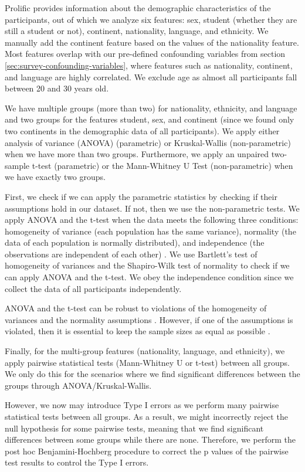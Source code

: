 %
Prolific provides information about the demographic characteristics of the participants, out of which we analyze six features: sex, student (whether they are still a student or not), continent, nationality, language, and ethnicity.
%
We manually add the continent feature based on the values of the nationality feature.
%
Most features overlap with our pre-defined confounding variables from section \ref{sec:survey-confounding-variables}, where features such as nationality, continent, and language are highly correlated.
%
We exclude age as almost all participants fall between 20 and 30 years old.
%

%
We have multiple groups (more than two) for nationality, ethnicity, and language and two groups for the features student, sex, and continent (since we found only two continents in the demographic data of all participants).
%
We apply either analysis of variance (ANOVA) (parametric) or Kruskal-Wallis (non-parametric) when we have more than two groups.
%
Furthermore, we apply an unpaired two-sample t-test (parametric) or the Mann-Whitney U Test (non-parametric) when we have exactly two groups.
%

%
First, we check if we can apply the parametric statistics by checking if their assumptions hold in our dataset.
%
If not, then we use the non-parametric tests.
%
We apply ANOVA and the t-test when the data meets the following three conditions: homogeneity of variance (each population has the same variance), normality (the data of each population is normally distributed), and independence (the observations are independent of each other) \citep{howell2012statistical}.
%
We use Bartlett's test of homogeneity of variances and the Shapiro-Wilk test of normality to check if we can apply ANOVA and the t-test.
%
We obey the independence condition since we collect the data of all participants independently.
%

%
ANOVA and the t-test can be robust to violations of the homogeneity of variances and the normality assumptions \citep{howell2012statistical}.
%
However, if one of the assumptions is violated, then it is essential to keep the sample sizes as equal as possible \citep{howell2012statistical}.
%

%
Finally, for the multi-group features (nationality, language, and ethnicity), we apply pairwise statistical tests (Mann-Whitney U or t-test) between all groups.
%
We only do this for the scenarios where we find significant differences between the groups through ANOVA/Kruskal-Wallis.
%

%
However, we now may introduce Type I errors as we perform many pairwise statistical tests between all groups.
%
As a result, we might incorrectly reject the null hypothesis for some pairwise tests, meaning that we find significant differences between some groups while there are none.
%
Therefore, we perform the post hoc Benjamini-Hochberg procedure to correct the p values of the pairwise test results to control the Type I errors.